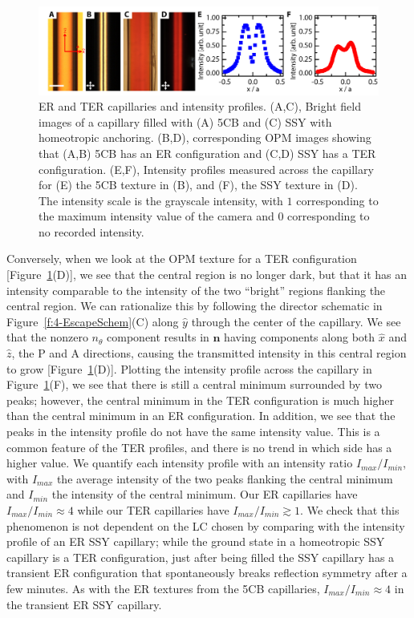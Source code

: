 \begin{figure}
  \centering
  \includegraphics{figures/C4/Ch4-Figs_StraightCaps.png}
  \caption{ER and TER capillaries and intensity profiles.
  (A,C), Bright field images of a capillary filled with (A) 5CB and (C) SSY with homeotropic anchoring.
  (B,D), corresponding OPM images showing that (A,B) 5CB has an ER configuration and (C,D) SSY has a TER configuration.
  (E,F), Intensity profiles measured across the capillary for (E) the 5CB texture in (B), and (F), the SSY texture in (D). The intensity scale is the grayscale intensity, with $1$ corresponding to the maximum intensity value of the camera and $0$ corresponding to no recorded intensity.}\label{f:4-StraightCaps}
\end{figure}

Conversely, when we look at the OPM texture for a TER configuration [Figure~\ref{f:4-StraightCaps}(D)], we see that the central region is no longer dark, but that it has an intensity comparable to the intensity of the two ``bright'' regions flanking the central region.
We can rationalize this by following the director schematic in Figure~\ref{f:4-EscapeSchem}(C) along $\hat{y}$ through the center of the capillary.
We see that the nonzero $n_{\theta}$ component results in $\mathbf{n}$ having components along both $\hat{x}$ and $\hat{z}$, the P and A directions, causing the transmitted intensity in this central region to grow [Figure~\ref{f:4-StraightCaps}(D)].
Plotting the intensity profile across the capillary in Figure~\ref{f:4-StraightCaps}(F), we see that there is still a central minimum surrounded by two peaks; however, the central minimum in the TER configuration is much higher than the central minimum in an ER configuration.
In addition, we see that the peaks in the intensity profile do not have the same intensity value.
This is a common feature of the TER profiles, and there is no trend in which side has a higher value.
We quantify each intensity profile with an intensity ratio $I_{max}/I_{min}$, with $I_{max}$ the average intensity of the two peaks flanking the central minimum and $I_{min}$ the intensity of the central minimum.
Our ER capillaries have $I_{max}/I_{min} \approx 4$ while our TER capillaries have $I_{max}/I_{min} \gtrsim 1$.
We check that this phenomenon is not dependent on the LC chosen by comparing with the intensity profile of an ER SSY capillary; while the ground state in a homeotropic SSY capillary is a TER configuration, just after being filled the SSY capillary has a transient ER configuration that spontaneously breaks reflection symmetry after a few minutes.
As with the ER textures from the 5CB capillaries, $I_{max}/I_{min} \approx 4$ in the transient ER SSY capillary.




